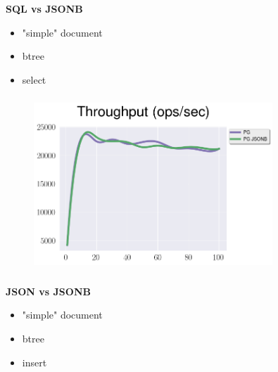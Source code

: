 \documentclass[usenames,dvipsnames, 18pt, compress, aspectratio=169]{beamer}
\begin{document}
\begin{frame}
    \frametitle{}
    \begin{center}
        \textbf{SQL vs JSONB}
        \begin{itemize}[label={}]
            \item "simple" document
            \item btree
            \item select
        \end{itemize}
    \end{center}
\end{frame}

\begin{frame}
    \frametitle{}
    \begin{center}
    \vspace{10pt}
    \begin{figure}
        \includegraphics[width=0.8\textwidth,center]{benchmarks/postgresql_run_jsonb_jdbc.png}
    \end{figure}
    \end{center}
\end{frame}

\begin{frame}
    \frametitle{}
    \begin{center}
        \textbf{JSON vs JSONB}
        \begin{itemize}[label={}]
            \item "simple" document
            \item btree
            \item insert
        \end{itemize}
    \end{center}
\end{frame}
\end{document}
